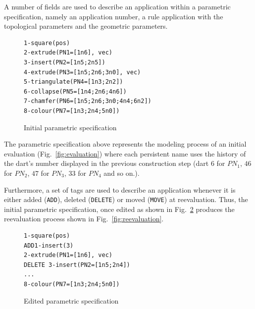 A number of fields are used to describe an application within a parametric
specification, namely an application number, a rule ap\-pli\-ca\-tion with 
the topological pa\-ra\-me\-ters and the geometric parameters. %
%
\begin{figure}
    \centering
    \small
\begin{verbatim}
1-square(pos)
2-extrude(PN1=[1n6], vec)
3-insert(PN2=[1n5;2n5])
4-extrude(PN3=[1n5;2n6;3n0], vec)
5-triangulate(PN4=[1n3;2n2])
6-collapse(PN5=[1n4;2n6;4n6])
7-chamfer(PN6=[1n5;2n6;3n0;4n4;6n2])
8-colour(PN7=[1n3;2n4;5n0])
\end{verbatim}
    \caption{Initial parametric specification}
    \label{fig:init-spec}
\end{figure}
%
The parametric specification above represents the modeling process of an
initial evaluation (Fig.~\ref{fig:evaluation}) where each persistent name 
uses the history of the dart's number displayed in the previous construction
step (dart $6$ for $PN_1$, $46$ for $PN_2$, $47$ for $PN_3$, $33$ for $PN_4$
and so on.). %

Furthermore, a set of tags are used to describe an application whenever it is either
added (\texttt{ADD}), deleted (\texttt{DELETE}) or moved (\texttt{MOVE}) at
reevaluation. %
Thus, the initial parametric specification, once edited as %
shown in Fig.~\ref{fig:reval-spec}
produces the
reevaluation process 
shown in Fig.~\ref{fig:reevaluation}.
%
\begin{figure}
    \centering
    \small
\begin{verbatim}
1-square(pos)
ADD1-insert(3)
2-extrude(PN1=[1n6], vec)
DELETE 3-insert(PN2=[1n5;2n4])
...
8-colour(PN7=[1n3;2n4;5n0])
\end{verbatim}
    \caption{Edited parametric specification}
    \label{fig:reval-spec}
\end{figure}